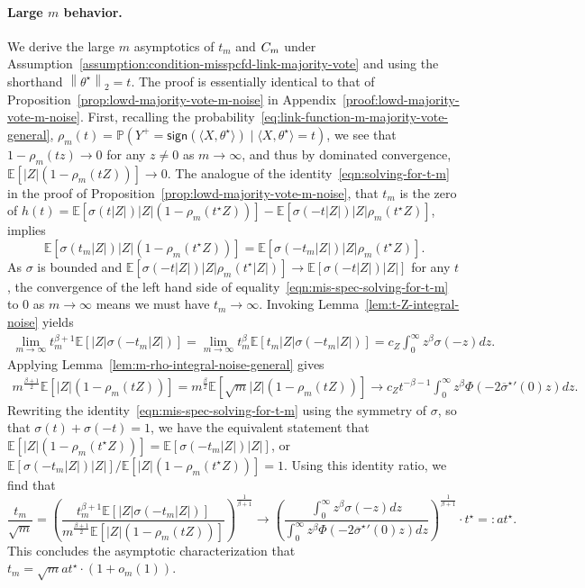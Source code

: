 \documentclass[11pt]{article}
\newcommand{\Ep}{\mathbb{E}}
\newcommand{\E}{\mathbb{E}}
\newcommand{\Prb}{\mathbb{P}}
\newcommand{\prn}[1]{\left({#1}\right)} %
\newcommand{\brk}[1]{\left[{#1}\right]} %
\newcommand{\norm}[1]{\left\|{#1}\right\|} %
\newcommand{\wb}[1]{\overline{#1}}
\newcommand{\majY}{Y^+}
\newcommand{\sgn}{\mathsf{sign}}
\newcommand{\ltwo}[1]{\norm{#1}_2} %
\newcommand{\<}{\langle} %
\renewcommand{\>}{\rangle}
\newcommand{\opt}{^\star}
\begin{document}
\paragraph{Large $m$ behavior.}
We derive the large $m$ asymptotics of $t_m$ and $C_m$ under
Assumption~\ref{assumption:condition-misspcfd-link-majority-vote} and using
the shorthand $\ltwo{\theta\opt} = t$. The proof is essentially identical to
that of Proposition~\ref{prop:lowd-majority-vote-m-noise} in
Appendix~\ref{proof:lowd-majority-vote-m-noise}.
First, recalling
the probability~\eqref{eq:link-function-m-majority-vote-general},
$\rho_m(t) = \Prb(\majY = \sgn(\<X, \theta\opt\>) \mid \<X,\theta\opt\> = t)$,
we see that $1 - \rho_m(t z) \to 0$ for
any $z \neq 0$ as $m \to \infty$, and thus by dominated convergence,
$\Ep \brk{|Z|\prn{1 - \rho_m(t Z)}} \to 0$.
The analogue of the identity~\eqref{eqn:solving-for-t-m}
in the proof of Proposition~\ref{prop:lowd-majority-vote-m-noise}, that
$t_m$ is the zero of $h(t) = \E[\sigma(t|Z|)|Z|(1 - \rho_m(t\opt Z))]
- \E[\sigma(-t|Z|) |Z| \rho_m(t\opt Z)]$, implies
\begin{equation}
  \Ep[\sigma(t_m|Z|) |Z|(1 - \rho_m(t\opt Z))]
  = \Ep \brk{\sigma(-t_m |Z|) |Z| \rho_m(t\opt Z)}.
  \label{eqn:mis-spec-solving-for-t-m}
\end{equation}
As $\sigma$ is bounded and $\E[\sigma(-t|Z|) |Z| \rho_m(t\opt |Z|)] \to
\E[\sigma(-t|Z|) |Z|]$ for any $t$, the convergence of the left hand side of
equality~\eqref{eqn:mis-spec-solving-for-t-m} to 0 as $m \to \infty$ means
we must have $t_m \to \infty$.
Invoking
Lemma~\ref{lem:t-Z-integral-noise} yields
\begin{align*}
  \lim_{m \to \infty} t_m^{\beta + 1} \Ep \brk{|Z| \sigma(-t_m |Z|)}
  =
  \lim_{m \to \infty} t_m^{\beta} \Ep \brk{t_m|Z| \sigma(-t_m |Z|)}
  = c_Z \int_0^\infty z^\beta \sigma(-z) dz.
\end{align*}
Applying Lemma~\ref{lem:m-rho-integral-noise-general} gives
\begin{align*}
  m^{\frac{\beta+1}{2}}\Ep \brk{|Z|(1-\rho_m(t Z))}
  =  m^{\frac{\beta}{2}} \Ep \brk{\sqrt m|Z|(1-\rho_m(t  Z))}
  \to c_Z {t}^{-\beta-1}\int_0^\infty z^\beta \Phi \left(-2{\wb{\sigma}\opt}'(0)z\right) dz.
\end{align*}
Rewriting the identity~\eqref{eqn:mis-spec-solving-for-t-m}
using the symmetry of $\sigma$, so that $\sigma(t) + \sigma(-t) = 1$,
we have the equivalent statement that
$\E[|Z|(1 - \rho_m(t\opt Z))] = \E[\sigma(-t_m |Z|) |Z|]$,
or $\E[\sigma(-t_m |Z|)|Z|] / \E[|Z|(1 - \rho_m(t\opt Z))] = 1$.
Using this identity ratio, we find that
\begin{equation*}
  \frac{t_m}{\sqrt{m}}
  =
  \left(\frac{	t_m^{\beta + 1}\Ep \brk{|Z| \sigma(-t_m|Z|)}}{
    m^{\frac{\beta+1}{2}} \Ep \brk{|Z|(1-\rho_m(t  Z))} }\right)^\frac{1}{\beta +1}
  \to
  \left(\frac{\int_{0}^{\infty} z^\beta \sigma(-z) dz}{
    \int_0^\infty z^\beta \Phi(-2{\wb{\sigma}\opt}'(0)z) dz}\right)^{
    \frac{1}{\beta +1}} \cdot t\opt
  = : a t\opt.
\end{equation*}
This concludes the asymptotic characterization that $t_m = \sqrt{m} a t\opt
\cdot(1 + o_m(1))$.
\end{document}
